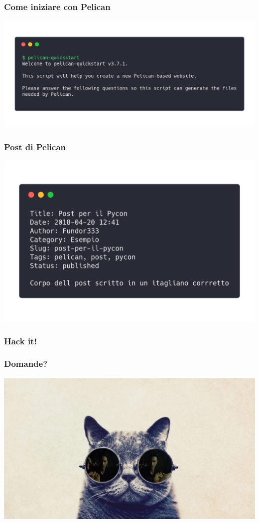 \begin{frame}
  \frametitle{Come iniziare con Pelican}
		\begin{center}
			\includegraphics[scale=0.2]{img/quickstart.png}
		\end{center}  
\end{frame}


\begin{frame}
  \frametitle{Post di Pelican}
		\begin{center}
			\includegraphics[scale=0.2]{img/post.png}
		\end{center}  
\end{frame}

\begin{frame}
	\frametitle{Hack it!}
\end{frame}

\begin{frame}
	\frametitle{Domande?}
	\begin{center}
		\includegraphics[scale=0.15]{img/cat-with-glasses}
	\end{center}
\end{frame}


